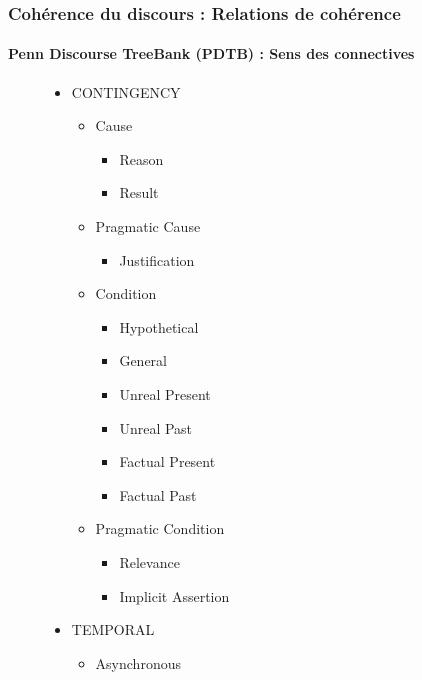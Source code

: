\documentclass[xcolor=table]{beamer}
\begin{document}
\begin{frame}
	\frametitle{Cohérence du discours : Relations de cohérence}
	\framesubtitle{Penn Discourse TreeBank (PDTB) : Sens des connectives}
	
	\begin{figure}
		\begin{minipage}{.3\textwidth}
			\tiny\bfseries
			\begin{itemize}
				\item CONTINGENCY
				\begin{itemize}\tiny\bfseries
					\item Cause
					\begin{itemize}\tiny\bfseries
						\item Reason
						\item Result
					\end{itemize}
					\item Pragmatic Cause
					\begin{itemize}\tiny\bfseries
						\item Justification
					\end{itemize}
					\item Condition
					\begin{itemize}\tiny\bfseries
						\item Hypothetical
						\item General
						\item Unreal Present
						\item Unreal Past
						\item Factual Present
						\item Factual Past
					\end{itemize}
					\item Pragmatic Condition
					\begin{itemize}\tiny\bfseries
						\item Relevance
						\item Implicit Assertion
					\end{itemize}
				\end{itemize}
			\end{itemize}
		\end{minipage}
		\begin{minipage}{.3\textwidth}
			\tiny\bfseries
			\begin{itemize}\tiny\bfseries
				\item TEMPORAL
				\begin{itemize}\tiny\bfseries
					\item Asynchronous

\end{itemize}
\end{itemize}
\end{minipage}
\end{figure}
\end{frame}
\end{document}
